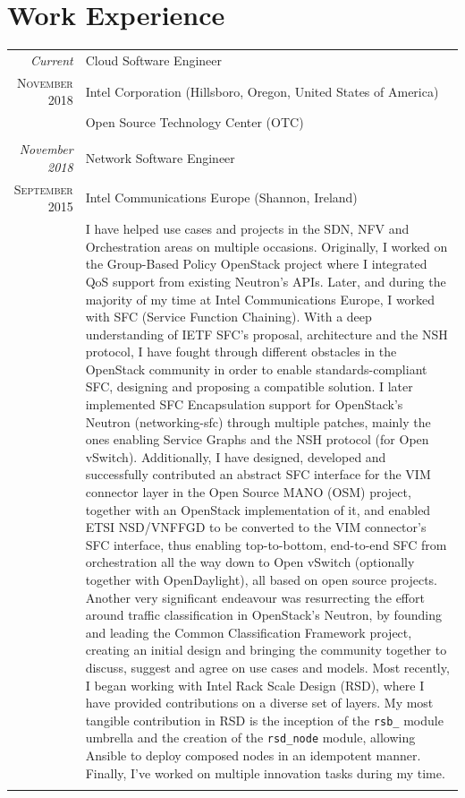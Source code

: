 \documentclass[letter,10pt]{article} %
\begin{document}
\section{Work Experience}
\label{section:work_experience}
\begin{tabular}{r|p{13.4cm}}
	\emph{Current} & Cloud Software Engineer \\
	\textsc{November 2018} & Intel Corporation (Hillsboro, Oregon, United States of America) \\
	& \footnotesize{Open Source Technology Center (OTC)}\\
	\multicolumn{2}{c}{} \\

	\emph{November 2018} & Network Software Engineer \\
	\textsc{September 2015} & Intel Communications Europe (Shannon, Ireland) \\
	& \footnotesize{I have helped use cases and projects in the SDN, NFV and Orchestration areas on multiple occasions. Originally, I worked on the Group-Based Policy OpenStack project where I integrated QoS support from existing Neutron's APIs. Later, and during the majority of my time at Intel Communications Europe, I worked with SFC (Service Function Chaining). With a deep understanding of IETF SFC's proposal, architecture and the NSH protocol, I have fought through different obstacles in the OpenStack community in order to enable standards-compliant SFC, designing and proposing a compatible solution. I later implemented SFC Encapsulation support for OpenStack's Neutron (networking-sfc) through multiple patches, mainly the ones enabling Service Graphs and the NSH protocol (for Open vSwitch). Additionally, I have designed, developed and successfully contributed an abstract SFC interface for the VIM connector layer in the Open Source MANO (OSM) project, together with an OpenStack implementation of it, and enabled ETSI NSD/VNFFGD to be converted to the VIM connector's SFC interface, thus enabling top-to-bottom, end-to-end SFC from orchestration all the way down to Open vSwitch (optionally together with OpenDaylight), all based on open source projects. Another very significant endeavour was resurrecting the effort around traffic classification in OpenStack's Neutron, by founding and leading the Common Classification Framework project, creating an initial design and bringing the community together to discuss, suggest and agree on use cases and models. Most recently, I began working with Intel Rack Scale Design (RSD), where I have provided contributions on a diverse set of layers. My most tangible contribution in RSD is the inception of the \verb+rsb_+ module umbrella and the creation of the \verb+rsd_node+ module, allowing Ansible to deploy composed nodes in an idempotent manner. Finally, I've worked on multiple innovation tasks during my time.}\\
	\multicolumn{2}{c}{} \\


\end{tabular}
\end{document}
